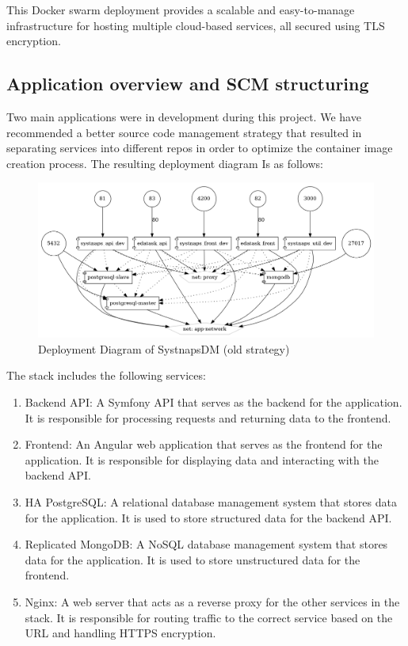 \hspace{7mm}This Docker swarm deployment provides a scalable and easy-to-manage infrastructure for hosting multiple cloud-based services, all secured using TLS encryption.

\newpage

\subsection{Application overview and SCM structuring}

\hspace{7mm}Two main applications were in development during this project. We have recommended a better source code management strategy that resulted in separating services into different repos in order to optimize the container image creation process. The resulting deployment diagram Is as follows: 

 \begin{figure}[H]\centering
\includegraphics[width=1.0\textwidth,angle=00]{assets/f10.png}
\caption{ Deployment Diagram of SystnapsDM (old strategy)}
\label{fig:DeploymentDiagram}
\end{figure}

\hspace{7mm}The stack includes the following services: 
\begin{enumerate}
\item Backend API: A Symfony\cite{Symfony} API that serves as the backend for the application. It is responsible for processing requests and returning data to the frontend. 
\item Frontend: An Angular\cite{Angular} web application that serves as the frontend for the application. It is responsible for displaying data and interacting with the backend API. 
\item HA PostgreSQL\cite{PostgreSQL}: A relational database management system that stores data for the application. It is used to store structured data for the backend API. 
\item Replicated MongoDB\cite{MongoDB}: A NoSQL database management system that stores data for the application. It is used to store unstructured data for the frontend. 
\item Nginx\cite{Nginx}: A web server that acts as a reverse proxy for the other services in the stack. It is responsible for routing traffic to the correct service based on the URL and handling HTTPS encryption. 
\end{enumerate}

